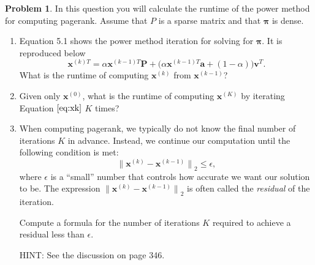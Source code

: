 \documentclass[10pt]{article}
\theoremstyle{definition}
\newtheorem{problem}{Problem}
\newcommand{\p}{\mathbf P}
\newcommand{\pr}{\bm \pi}
\newcommand{\x}{\mathbf x}
\newcommand{\ltwo}[1]{{\lVert {#1} \rVert}_2}
\begin{document}
{%

\newpage

\begin{problem}
    In this question you will calculate the runtime of the power method for computing pagerank.
    Assume that $P$ is a sparse matrix and that $\pr$ is dense.

    \begin{enumerate}
        \item
            Equation 5.1 shows the power method iteration for solving for $\pr$.
            It is reproduced below
            \begin{equation}
                \x^{(k)T}
                =
                \alpha \x^{(k-1)T} \p + \big(\alpha \x^{(k-1)T} \mathbf a + (1-\alpha)\big) \mathbf v^T
                .
                \label{eq:xk}
            \end{equation}
            What is the runtime of computing $\x^{(k)}$ from $\x^{(k-1)}$? %
            \vspace{4in}

        \item 
            \label{item:2}
            Given only $\x^{(0)}$, what is the runtime of computing $\x^{(K)}$ by iterating Equation $\eqref{eq:xk}$ $K$ times?
            \vspace{4in}

        \item
            \label{item:3}
            When computing pagerank,
            we typically do not know the final number of iterations $K$ in advance.
            Instead, we continue our computation until the following condition is met:
            \begin{equation}
                \ltwo { \x^{(k)} - \x^{(k-1)} } \le \epsilon,
            \end{equation}
            where $\epsilon$ is a ``small'' number that controls how accurate we want our solution to be.
            The expression $\ltwo { \x^{(k)} - \x^{(k-1)} }$ is often called the \emph{residual} of the iteration.

            Compute a formula for the number of iterations $K$ required to achieve a residual less than $\epsilon$.

            HINT:
            See the discussion on page 346.
            \vspace{4in}


\end{enumerate}
\end{problem}}
\end{document}
